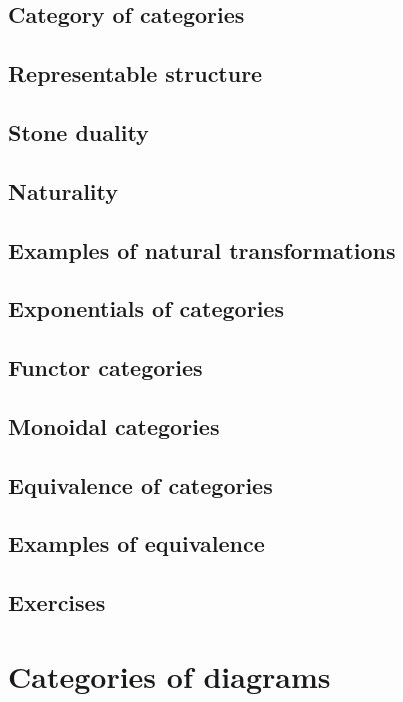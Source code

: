 \documentclass[uplatex, 12pt, dvipdfmx]{jsarticle}
\begin{document}
\subsection{Category of categories}

\subsection{Representable structure}

\subsection{Stone duality}

\subsection{Naturality}

\subsection{Examples of natural transformations}

\subsection{Exponentials of categories}

\subsection{Functor categories}

\subsection{Monoidal categories}

\subsection{Equivalence of categories}

\subsection{Examples of equivalence}

\subsection{Exercises}

\section{Categories of diagrams}
\end{document}
